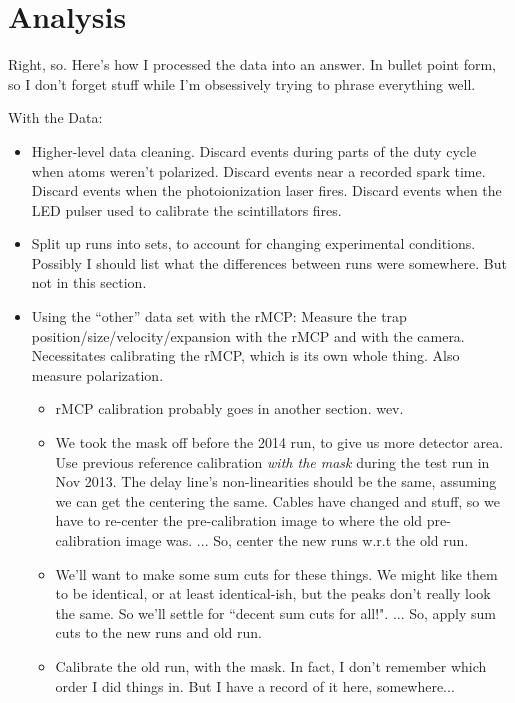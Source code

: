 


\clearpage
\chapter{Analysis}
\label{analysis_chapter}

Right, so.  Here's how I processed the data into an answer.  In bullet point form, so I don't forget stuff while I'm obsessively trying to phrase everything well.  
\newline

With the Data:
\begin{itemize}
	\item Higher-level data cleaning.  Discard events during parts of the duty cycle when atoms weren't polarized.  Discard events near a recorded spark time.  Discard events when the photoionization laser fires.  Discard events when the LED pulser used to calibrate the scintillators fires.  
	\item Split up runs into sets, to account for changing experimental conditions.  Possibly I should list what the differences between runs were somewhere.  But not in this section.
	\item Using the ``other'' data set with the rMCP:  Measure the trap position/size/velocity/expansion with the rMCP and with the camera.  Necessitates calibrating the rMCP, which is its own whole thing.  Also measure polarization.
		\begin{itemize}
		\item rMCP calibration probably goes in another section.  wev.
		\item We took the mask off before the 2014 run, to give us more detector area.  Use previous reference calibration \emph{with the mask} during the test run in Nov 2013.  The delay line's non-linearities should be the same, assuming we can get the centering the same.  Cables have changed and stuff, so we have to re-center the pre-calibration image to where the old pre-calibration image was.  ...  So, center the new runs w.r.t the old run.
		\item We'll want to make some sum cuts for these things.  We might like them to be identical, or at least identical-ish, but the peaks don't really look the same.  So we'll settle for ``decent sum cuts for all!".  ...  So, apply sum cuts to the new runs and old run.
		\item Calibrate the old run, with the mask.  In fact, I don't remember which order I did things in.  But I have a record of it here, somewhere...

\end{itemize}
\end{itemize}

